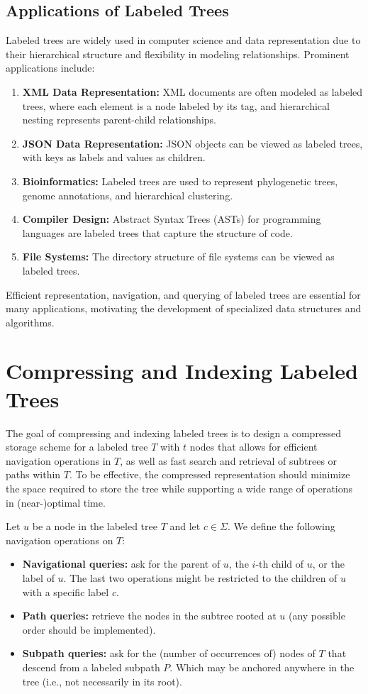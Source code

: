 \subsection{Applications of Labeled Trees}
Labeled trees are widely used in computer science and data representation due to their hierarchical structure and flexibility in modeling relationships. Prominent applications include:
\begin{enumerate}
    \item \textbf{XML Data Representation:} XML documents are often modeled as labeled trees, where each element is a node labeled by its tag, and hierarchical nesting represents parent-child relationships.
    \item \textbf{JSON Data Representation:} JSON objects can be viewed as labeled trees, with keys as labels and values as children.
    \item \textbf{Bioinformatics:} Labeled trees are used to represent phylogenetic trees, genome annotations, and hierarchical clustering.
    \item \textbf{Compiler Design:} Abstract Syntax Trees (ASTs) for programming languages are labeled trees that capture the structure of code.
    \item \textbf{File Systems:} The directory structure of file systems can be viewed as labeled trees.
\end{enumerate}

Efficient representation, navigation, and querying of labeled trees are essential for many applications, motivating the development of specialized data structures and algorithms. 

\section{Compressing and Indexing Labeled Trees} \label{compandindexinglabtree}
The goal of compressing and indexing labeled trees is to design a compressed storage scheme for a labeled tree $T$ with $t$ nodes that allows for efficient navigation operations in $T$, as well as fast search and retrieval of subtrees or paths within $T$. To be effective, the compressed representation should minimize the space required to store the tree while supporting a wide range of operations in (near-)optimal time.

Let $u$ be a node in the labeled tree $T$ and let $c \in \Sigma$. We define the following navigation operations on $T$:
\begin{itemize}
    \item \textbf{Navigational queries:} ask for the parent of $u$, the $i$-th child of $u$, or the label of $u$. The last two operations might be restricted to the children of $u$ with a specific label $c$.
    \item \textbf{Path queries:} retrieve the nodes in the subtree rooted at $u$ (any possible order should be implemented).
    \item \textbf{Subpath queries:} ask for the (number of occurrences of) nodes of $T$ that descend from a labeled subpath $P$. Which may be anchored anywhere in the tree (i.e., not necessarily in its root). 
\end{itemize}

